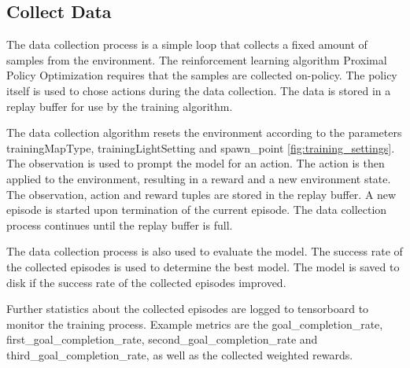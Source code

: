\subsection{Collect Data}

The data collection process is a simple loop that collects a fixed amount of samples from the environment. The reinforcement learning algorithm Proximal Policy Optimization requires that the samples are collected on-policy. The policy itself is used to chose actions during the data collection. The data is stored in a replay buffer for use by the training algorithm.

The data collection algorithm resets the environment according to the parameters trainingMapType, trainingLightSetting and spawn\_point \ref{fig:training_settings}. The observation is used to prompt the model for an action. The action is then applied to the environment, resulting in a reward and a new environment state. The observation, action and reward tuples are stored in the replay buffer. A new episode is started upon termination of the current episode. The data collection process continues until the replay buffer is full.

The data collection process is also used to evaluate the model. The success rate of the collected episodes is used to determine the best model. The model is saved to disk if the success rate of the collected episodes improved.

Further statistics about the collected episodes are logged to tensorboard to monitor the training process. Example metrics are the goal\_completion\_rate, first\_goal\_completion\_rate, second\_goal\_completion\_rate and third\_goal\_completion\_rate, as well as the collected weighted rewards.


